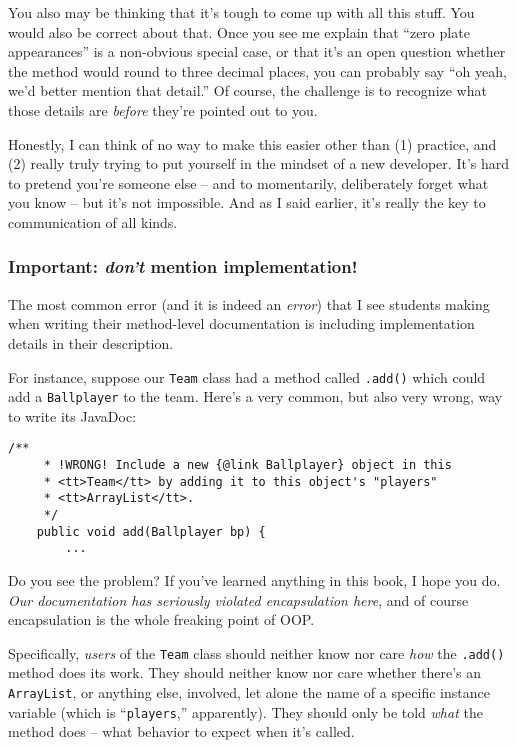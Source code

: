 You also may be thinking that it's tough to come up with all this stuff. You
would also be correct about that. Once you see me explain that ``zero plate
appearances'' is a non-obvious special case, or that it's an open question
whether the method would round to three decimal places, you can probably say
``oh yeah, we'd better mention that detail.'' Of course, the challenge is to
recognize what those details are \textit{before} they're pointed out to you.

Honestly, I can think of no way to make this easier other than (1) practice,
and (2) really truly trying to put yourself in the mindset of a new developer.
It's hard to pretend you're someone else -- and to momentarily, deliberately
forget what you know -- but it's not impossible. And as I said earlier, it's
really the key to communication of all kinds.

\subsubsection{Important: \textit{don't} mention implementation!}

The most common error (and it is indeed an \textit{error}) that I see students
making when writing their method-level documentation is including
implementation details in their description.

For instance, suppose our \texttt{Team} class had a method called
\texttt{.add()} which could add a \texttt{Ballplayer} to the team. Here's a
very common, but also very wrong, way to write its JavaDoc:

\vspace{-.15in}
\begin{Verbatim}[fontsize=\scriptsize,samepage=true,frame=single]
    /**
     * !WRONG! Include a new {@link Ballplayer} object in this
     * <tt>Team</tt> by adding it to this object's "players"
     * <tt>ArrayList</tt>.
     */
    public void add(Ballplayer bp) {
        ...
\end{Verbatim}


Do you see the problem? If you've learned anything in this book, I hope you do.
\textit{Our documentation has seriously violated encapsulation here}, and of
course encapsulation is the whole freaking point of OOP.

Specifically, \textit{users} of the \texttt{Team} class should neither know nor
care \textit{how} the \texttt{.add()} method does its work. They should neither
know nor care whether there's an \texttt{ArrayList}, or anything else,
involved, let alone the name of a specific instance variable (which is
``\texttt{players},'' apparently). They should only be told \textit{what} the
method does -- what behavior to expect when it's called.

